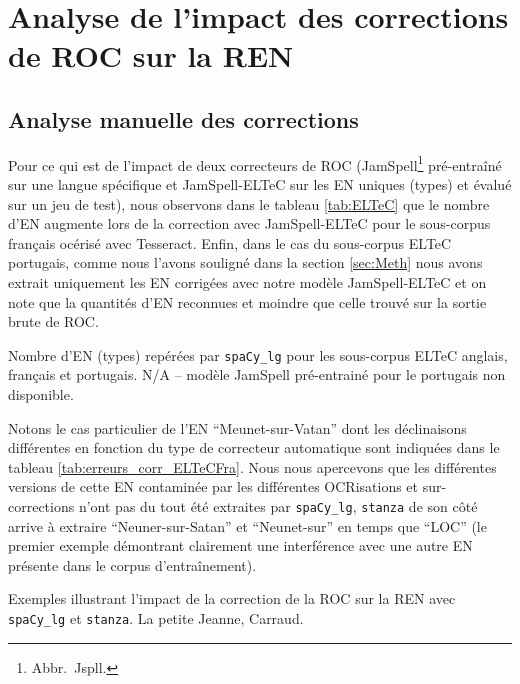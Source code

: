 \section{Analyse de l'impact des corrections de ROC sur la REN}
\label{subsec:COR-OCR-IMPACT-NER}
\subsection{Analyse manuelle des corrections }
Pour ce qui est de l'impact de deux correcteurs de ROC (JamSpell\footnote{Abbr.\ Jspll.} pré-entraîné sur une langue spécifique et JamSpell-ELTeC  sur les EN uniques (types) et évalué sur un jeu de test), nous observons dans le tableau \ref{tab:ELTeC} que le nombre d'EN augmente lors de la correction avec JamSpell-ELTeC pour le sous-corpus français océrisé avec Tesseract. 
Enfin, dans le cas du sous-corpus ELTeC portugais, comme nous l'avons souligné dans la section \ref{sec:Meth} nous avons extrait uniquement les EN corrigées avec notre modèle JamSpell-ELTeC et on note que la quantités d'EN reconnues et moindre que celle trouvé sur la sortie brute de ROC.
\begin{table}[h!]
    \centering
    \small
    
    \caption{Nombre d'EN (types) repérées par \texttt{spaCy\_lg} pour les sous-corpus ELTeC anglais, français et portugais. N/A -- modèle JamSpell pré-entrainé pour le portugais non disponible.}
    \label{tab:ELTeC}
\end{table}

Notons le cas particulier de l'EN ``Meunet-sur-Vatan'' dont les déclinaisons différentes en fonction du type de correcteur automatique sont indiquées dans le tableau \ref{tab:erreurs_corr_ELTeCFra}. Nous nous apercevons que les différentes versions de cette EN contaminée par les différentes OCRisations et sur-corrections n'ont pas du tout été extraites par \texttt{spaCy\_lg}, \texttt{stanza} de son côté arrive à extraire ``Neuner-sur-Satan'' et ``Neunet-sur'' en temps que ``LOC'' (le premier exemple démontrant clairement une interférence avec une autre EN présente dans le corpus d'entraînement).

\begin{table}[h!]
    \small
    \centering
   
     \caption{Exemples illustrant l'impact de la correction de la ROC sur la REN avec \texttt{spaCy\_lg} et \texttt{stanza}. {\normalfont La petite Jeanne}, Carraud.}
    \label{tab:erreurs_corr_ELTeCFra}
\end{table}

